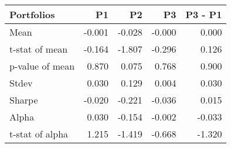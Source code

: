 \begin{tabular}{lrrrr}
\toprule
Portfolios & P1 & P2 & P3 & P3 - P1 \\
\midrule
Mean & -0.001 & -0.028 & -0.000 & 0.000 \\
t-stat of mean & -0.164 & -1.807 & -0.296 & 0.126 \\
p-value of mean & 0.870 & 0.075 & 0.768 & 0.900 \\
Stdev & 0.030 & 0.129 & 0.004 & 0.030 \\
Sharpe & -0.020 & -0.221 & -0.036 & 0.015 \\
Alpha & 0.030 & -0.154 & -0.002 & -0.033 \\
t-stat of alpha & 1.215 & -1.419 & -0.668 & -1.320 \\
\bottomrule
\end{tabular}
